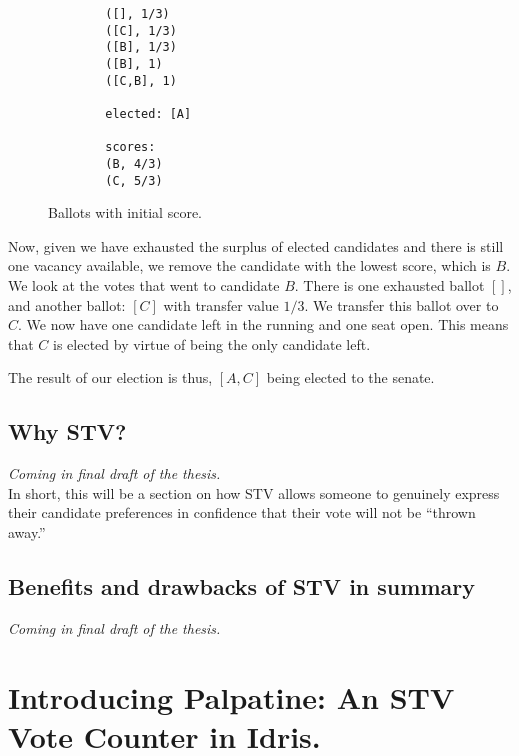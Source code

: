 \begin{figure}[ht!!!!!!!!]
    \caption{Ballots with initial score.}
    \label{sample_election3}
    \begin{lstlisting}
        ([], 1/3)
        ([C], 1/3)
        ([B], 1/3)
        ([B], 1)
        ([C,B], 1)

        elected: [A]

        scores: 
        (B, 4/3)
        (C, 5/3)
    \end{lstlisting}
\end{figure}

Now, given we have exhausted the surplus of elected candidates and there is
still one vacancy available, we remove the candidate with the lowest score,
which is $B$. We look at the votes that went to candidate $B$. There is one
exhausted ballot $[]$, and another ballot: $[C]$ with transfer value $1/3$. We
transfer this ballot over to $C$. We now have one candidate left in the running
and one seat open. This means that $C$ is elected by virtue of being the only
candidate left. 

The result of our election is thus, $[A,C]$ being elected to the senate.  

\section{Why STV?}
\textit{Coming in final draft of the thesis.} \\
In short, this will be a section on how STV allows someone to genuinely express
their candidate preferences in confidence that their vote will not be ``thrown
away.''

\section{Benefits and drawbacks of STV in summary}
\textit{Coming in final draft of the thesis.}



\chapter{Introducing Palpatine: An STV Vote Counter in Idris.}
